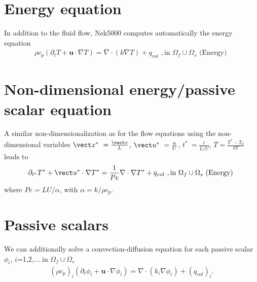 
\section{Energy equation}
In addition to the fluid flow, Nek5000 computes automatically the energy equation
\begin{eqnarray}\label{eq:energy}
 \rho c_{p} ( \partial_{t} T + \mathbf u \cdot \nabla T ) =
   \nabla \cdot (k \nabla T) + q_{vol}\,\, ,\text{in } \Omega_f\cup \Omega_s  \text{  (Energy)  } 
\end{eqnarray}

\section{Non-dimensional energy/passive scalar equation}
A similar non-dimensionalization as for the flow equations using the non-dimensional variables
\(\vect x^*\ = \frac{\vect x}{L}\),  \(\vect u^*\ = \frac{u}{U}\), \(t^*\ = \frac{t}{L/U}\), \(T=\frac{T^*-T_0}{\delta T}\) leads to
\begin{eqnarray}\label{eq:energy_nondim}
\partial_{t^*} T^* + \vect u^* \cdot \nabla T^* =
  \frac{1}{Pe} \nabla \cdot \nabla T^* + q_{vol}\,\, ,\text{in } \Omega_f\cup \Omega_s  \text{  (Energy)  } 
\end{eqnarray}
where \(Pe=LU/\alpha\), with \(\alpha=k/\rho c_p\).


\section{Passive scalars}\label{sec:passive_scal}

We can additionally solve a convection-diffusion equation for each passive scalar \(\phi_i\),
\(i\)=1,2,\(\ldots\) in \(\Omega_f \cup \Omega_s\)
\begin{eqnarray}\label{eq:pass_scal}
   (\rho c_{p})_i ( \partial_{t} \phi_{i} + \mathbf u \cdot \nabla \phi_{i} ) =
   \nabla \cdot (k_i \nabla \phi_{i}) + (q_{vol})_i.
\end{eqnarray}

